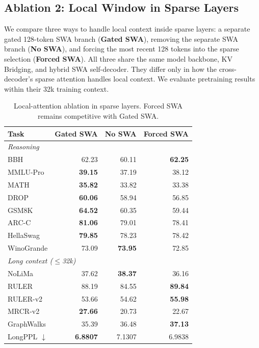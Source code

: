 \subsection{Ablation 2: Local Window in Sparse Layers}
\label{sec:swa-ablation}

We compare three ways to handle local context inside sparse layers: a separate gated 128-token SWA branch (\textbf{Gated SWA}), removing the separate SWA branch (\textbf{No SWA}), and forcing the most recent 128 tokens into the sparse selection (\textbf{Forced SWA}).
All three share the same model backbone, KV Bridging, and hybrid SWA self-decoder. They differ only in how the cross-decoder's sparse attention handles local context.
We evaluate pretraining results within their 32k training context.

\begin{table}[H]
    \centering
    \small
    \setlength{\tabcolsep}{10pt}
    \begin{tabular}{lrrr}
        \toprule
        \textbf{Task} & \textbf{Gated SWA} & \textbf{No SWA} & \textbf{Forced SWA} \\
        \midrule
        \multicolumn{4}{l}{\textit{Reasoning}} \\
        BBH & 62.23 & 60.11 & \textbf{62.25} \\
        MMLU-Pro & \textbf{39.15} & 37.19 & 38.12 \\
        MATH & \textbf{35.82} & 33.82 & 33.38 \\
        DROP & \textbf{60.06} & 58.94 & 56.85 \\
        GSM8K & \textbf{64.52} & 60.35 & 59.44 \\
        ARC-C & \textbf{81.06} & 79.01 & 78.41 \\
        HellaSwag & \textbf{79.85} & 78.23 & 78.42 \\
        WinoGrande & 73.09 & \textbf{73.95} & 72.85 \\
        \midrule
        \multicolumn{4}{l}{\textit{Long context ($\leq$32k)}} \\
        NoLiMa & 37.62 & \textbf{38.37} & 36.16 \\
        RULER & 88.19 & 84.55 & \textbf{89.84} \\
        RULER-v2 & 53.66 & 54.62 & \textbf{55.98} \\
        MRCR-v2 & \textbf{27.66} & 20.73 & 22.67 \\
        GraphWalks & 35.39 & 36.48 & \textbf{37.13} \\
        LongPPL $\downarrow$ & \textbf{6.8807} & 7.1307 & 6.9838 \\
        \bottomrule
    \end{tabular}
    \caption{Local-attention ablation in sparse layers. Forced SWA remains competitive with Gated SWA.}
    \label{tab:swa-ablation}
\end{table}


